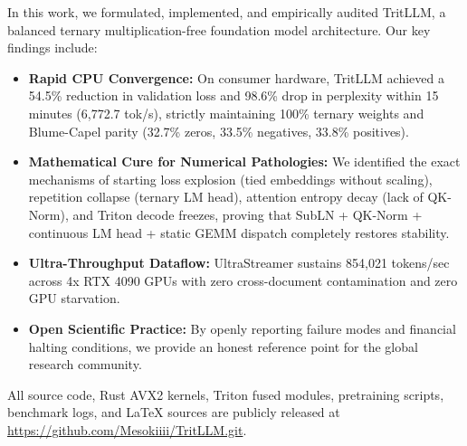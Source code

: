 \documentclass[11pt,a4paper]{article}
\begin{document}
In this work, we formulated, implemented, and empirically audited TritLLM, a balanced ternary multiplication-free foundation model architecture. Our key findings include:
\begin{itemize}
    \item \textbf{Rapid CPU Convergence:} On consumer hardware, TritLLM achieved a 54.5\% reduction in validation loss and 98.6\% drop in perplexity within 15 minutes (6,772.7 tok/s), strictly maintaining 100\% ternary weights and Blume-Capel parity (32.7\% zeros, 33.5\% negatives, 33.8\% positives).
    \item \textbf{Mathematical Cure for Numerical Pathologies:} We identified the exact mechanisms of starting loss explosion (tied embeddings without scaling), repetition collapse (ternary LM head), attention entropy decay (lack of QK-Norm), and Triton decode freezes, proving that SubLN + QK-Norm + continuous LM head + static GEMM dispatch completely restores stability.
    \item \textbf{Ultra-Throughput Dataflow:} UltraStreamer sustains 854,021 tokens/sec across 4x RTX 4090 GPUs with zero cross-document contamination and zero GPU starvation.
    \item \textbf{Open Scientific Practice:} By openly reporting failure modes and financial halting conditions, we provide an honest reference point for the global research community.
\end{itemize}

All source code, Rust AVX2 kernels, Triton fused modules, pretraining scripts, benchmark logs, and LaTeX sources are publicly released at \url{https://github.com/Mesokiiii/TritLLM.git}.
\end{document}
